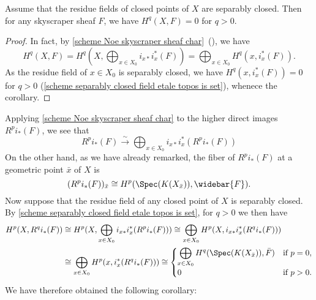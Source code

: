 \begin{corollary}\label{scheme Noe skyscraper sheaf cohomology trivial if separably closed}
Assume that the residue fields of closed points of $X$ are separably closed. Then for any skyscraper sheaf $F$, we have $H^q(X,F)=0$ for $q>0$.
\end{corollary}
\begin{proof}
In fact, by \cref{scheme Noe skyscraper sheaf char}~(), we have
\[H^q(X,F)=H^q(X,\bigoplus_{x\in X_0}i_{x*}i_x^*(F))=\bigoplus_{x\in X_0}H^q(x,i_x^*(F)).\]
As the residue field of $x\in X_0$ is separably closed, we have $H^q(x,i_x^*(F))=0$ for $q>0$ (\cref{scheme separably closed field etale topos is set}), whenece the corollary.
\end{proof}

Applying \cref{scheme Noe skyscraper sheaf char} to the higher direct images $R^pi_*(F)$, we see that
\[R^pi_*(F) \stackrel{\sim}{\to} \bigoplus_{x\in X_0}i_{x*}i_x^*(R^pi_*(F))\]
On the other hand, as we have already remarked, the fiber of $R^pi_*(F)$ at a geometric point $\bar{x}$ of $X$ is 
\[(R^pi_*(F))_{\bar{x}}\cong H^p(\Spec(K(X_{\bar{x}})),\widebar{F}).\]
Now suppose that the residue field of any closed point of $X$ is separably closed. By \cref{scheme separably closed field etale topos is set}, for $q>0$ we then have
\begin{align*}
H^p(X,R^qi_*(F))&\cong H^p(X,\bigoplus_{x\in X_0}i_{x*}i_x^*(R^pi_*(F)))\cong \bigoplus_{x\in X_0}H^p(X,i_{x*}i_x^*(R^qi_*(F)))\\
&\cong \bigoplus_{x\in X_0}H^p(x,i_x^*(R^qi_*(F)))\cong\begin{cases}
\displaystyle\bigoplus_{x\in X_0}H^q(\Spec(K(X_{\bar{x}})),\bar{F})&\text{if $p=0$},\\[8pt]
0&\text{if $p>0$}.
\end{cases}
\end{align*}
We have therefore obtained the following corollary:

